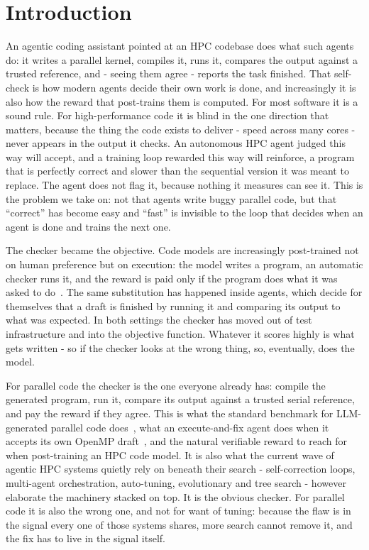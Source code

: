 \section{Introduction}

An agentic coding assistant pointed at an HPC codebase does what such agents do: it writes a parallel kernel, compiles it, runs it, compares the output against a trusted reference, and - seeing them agree - reports the task finished. That self-check is how modern agents decide their own work is done, and increasingly it is also how the reward that post-trains them is computed. For most software it is a sound rule. For high-performance code it is blind in the one direction that matters, because the thing the code exists to deliver - speed across many cores - never appears in the output it checks. An autonomous HPC agent judged this way will accept, and a training loop rewarded this way will reinforce, a program that is perfectly correct and slower than the sequential version it was meant to replace. The agent does not flag it, because nothing it measures can see it. This is the problem we take on: not that agents write buggy parallel code, but that ``correct'' has become easy and ``fast'' is invisible to the loop that decides when an agent is done and trains the next one.

The checker became the objective. Code models are increasingly post-trained not on human preference but on execution: the model writes a program, an automatic checker runs it, and the reward is paid only if the program does what it was asked to do~\cite{tulu3,deepseekr1,grpo}. The same substitution has happened inside agents, which decide for themselves that a draft is finished by running it and comparing its output to what was expected. In both settings the checker has moved out of test infrastructure and into the objective function. Whatever it scores highly is what gets written - so if the checker looks at the wrong thing, so, eventually, does the model.

For parallel code the checker is the one everyone already has: compile the generated program, run it, compare its output against a trusted serial reference, and pay the reward if they agree. This is what the standard benchmark for LLM-generated parallel code does~\cite{pareval}, what an execute-and-fix agent does when it accepts its own OpenMP draft~\cite{selfdebug,reflexion}, and the natural verifiable reward to reach for when post-training an HPC code model. It is also what the current wave of agentic HPC systems quietly rely on beneath their search - self-correction loops, multi-agent orchestration, auto-tuning, evolutionary and tree search - however elaborate the machinery stacked on top. It is the obvious checker. For parallel code it is also the wrong one, and not for want of tuning: because the flaw is in the signal every one of those systems shares, more search cannot remove it, and the fix has to live in the signal itself.

